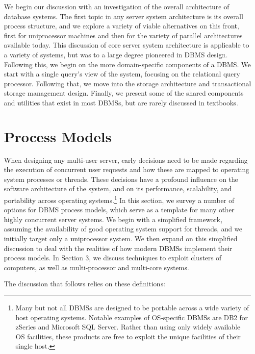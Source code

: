 \documentclass[a4paper,11pt,twoside,openright]{book}
\begin{document}
We begin our discussion with an investigation of the overall
architecture of database systems. The first topic in any server system
architecture is its overall process structure, and we explore a variety
of viable alternatives on this front, first for uniprocessor machines
and then for the variety of parallel architectures available today. This
discussion of core server system architecture is applicable to a variety
of systems, but was to a large degree pioneered in DBMS design.
Following this, we begin on the more domain-specific components of a
DBMS. We start with a single query's view of the system, focusing on the
relational query processor. Following that, we move into the storage
architecture and transactional storage management design. Finally, we
present some of the shared components and utilities that exist in most
DBMSs, but are rarely discussed in textbooks.

\hypertarget{process-models}{%
\chapter{Process Models}\label{process-models}}

When designing any multi-user server, early decisions need to be made
regarding the execution of concurrent user requests and how these are
mapped to operating system processes or threads. These decisions have a
profound influence on the software architecture of the system, and on
its performance, scalability, and portability across operating
systems.\footnote{Many but not all DBMSs are designed to be portable
across a wide variety of host operating systems. Notable examples of
OS-specific DBMSs are DB2 for zSeries and Microsoft SQL Server. Rather
than using only widely available OS facilities, these products are free
to exploit the unique facilities of their single host.}
In this section, we survey a number of
options for DBMS process models, which serve as a template for many
other highly concurrent server systems. We begin with a simplified
framework, assuming the availability of good operating system support
for threads, and we initially target only a uniprocessor system. We then
expand on this simplified discussion to deal with the realities of how
modern DBMSs implement their process models. In Section 3, we discuss
techniques to exploit clusters of computers, as well as multi-processor
and multi-core systems.

The discussion that follows relies on these definitions:
\end{document}
